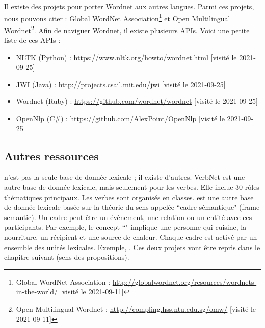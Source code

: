 \documentclass{KodeBook}
\begin{document}
%

Il existe des projets pour porter Wordnet aux autres langues. 
Parmi ces projets, nous pouvons citer : Global WordNet Association\footnote{Global WordNet Association : \url{http://globalwordnet.org/resources/wordnets-in-the-world/} [visité le 2021-09-11]} et Open Multilingual Wordnet\footnote{Open Multilingual Wordnet : \url{http://compling.hss.ntu.edu.sg/omw/} [visité le 2021-09-11]}.
Afin de naviguer Wordnet, il existe plusieurs APIs. 
Voici une petite liste de  ces APIs :
\begin{itemize}
	\item NLTK (Python) : \url{https://www.nltk.org/howto/wordnet.html} [visité le 2021-09-25]
	\item JWI (Java) : \url{http://projects.csail.mit.edu/jwi} [visité le 2021-09-25]
	\item Wordnet (Ruby) : \url{https://github.com/wordnet/wordnet} [visité le 2021-09-25]
	\item OpenNlp (C\#) : \url{https://github.com/AlexPoint/OpenNlp} [visité le 2021-09-25]
\end{itemize}

\subsection{Autres ressources}

 n'est pas la seule base de donnée lexicale ; il existe d'autres. 
VerbNet est une autre base de donnée lexicale, mais seulement pour les verbes. 
Elle inclue 30 rôles thématiques principaux. 
Les verbes sont organisés en classes. 
 est une autre base de donnée lexicale basée sur la théorie du sens appelée ``cadre sémantique" (frame semantic). 
Un cadre peut être un évènement, une relation ou un entité avec ces participants. 
Par exemple, le concept ``" implique une personne qui cuisine, la nourriture, un récipient et une source de chaleur.
Chaque cadre est activé par un ensemble des unités lexicales. 
Exemple, .
Ces deux projets vont être repris dans le chapitre suivant (sens des propositions).
\end{document}
